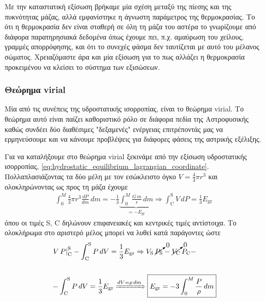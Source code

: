 Με την καταστατική εξίσωση βρήκαμε μία σχέση μεταξύ της πίεσης και της πυκνότητας μάζας, αλλά εμφανίστηκε η άγνωστη παράμετρος της θερμοκρασίας. Το ότι η θερμοκρασία δεν είναι σταθερή σε όλη τη μάζα του αστέρα το γνωρίζουμε από διάφορα παρατηρησιακά δεδομένα όπως έχουμε πει, π.χ. αμαύρωση του χείλους, γραμμές απορρόφησης, και ότι το συνεχές φάσμα δεν ταυτίζεται με αυτό του μέλανος σώματος. Χρειαζόμαστε άρα και μία εξίσωση για το πως αλλάζει η θερμοκρασία προκειμένου να κλείσει το σύστημα των εξισώσεων.
\subsubsection{Θεώρημα virial}
Μία από τις συνέπεις της υδροστατικής ισορροπίας, είναι το θεώρημα virial. Το θεώρημα αυτό είναι παίζει καθοριστικό ρόλο σε διάφορα πεδία της Αστροφυσικής καθώς συνδέει δύο διαθέσιμες "δεξαμενές" ενέργειας επιτρέποντάς μας να ερμηνεύσουμε και να κάνουμε προβλέψεις για διάφορες φάσεις της αστρικής εξέλιξης.

Για να καταλήξουμε στο θεώρημα virial ξεκινάμε από την εξίσωση υδροστατικής ισορροπίας, \eqref{eq:hydrostatic_equilibrium_lagrangian_coordinate}. Πολλαπλασιάζοντας τα δύο μέλη με τον εσώκλειστο όγκο $V = \frac{4}{3}\pi r^3$ και ολοκληρώνοντας ως προς τη μάζα έχουμε
\begin{align*}
    \int_{0}^{M} \frac{4}{3} \pi r^3 \frac{dP}{dm} \,dm  = - \frac{1}{3} \underbrace{\int_{0}^{M} \frac{G \,m}{r} \,dm}_{= - E_{\text{gr}}} \Rightarrow \int_{\text{C}}^{\text{S}} V \,dP = \frac{1}{3} E_{\text{gr}}
\end{align*}
όπου οι τιμές S, C δηλώνουν επιφανειακές και κεντρικές τιμές αντίστοιχα. Το ολοκλήρωμα στο αριστερό μέλος μπορεί να λυθεί κατά παράγοντες ώστε
\begin{align}
    \label{eq:generic_form_virial}
    \nonumber &\left. V \,P \right|_{\text{C}}^{\text{S}} - \int_{\text{C}}^{\text{S}} P \,dV = \frac{1}{3} E_{\text{gr}} \Rightarrow V_{\text{S}}  \,\cancelto{0}{P_{\text{S}}} - \cancelto{0}{V_{\text{C}}} \,P_{\text{C}} - \\ \nonumber \\
    &- \int_{\text{C}}^{\text{S}} P \,dV = \frac{1}{3} E_{\text{gr}} \xRightarrow{dV = \rho \,dm} \boxed{E_{\text{gr}} = -3 \int_{0}^{M} \frac{P}{\rho} \,dm}
\end{align}


